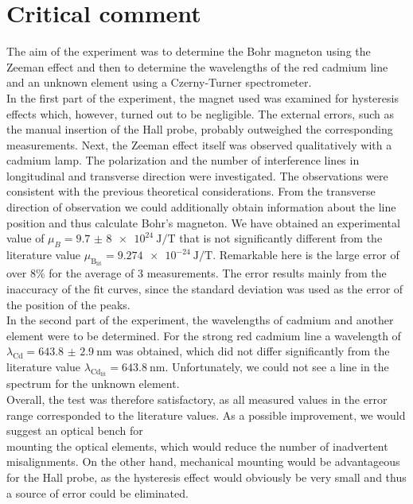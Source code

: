 \section{Critical comment}
The aim of the experiment was to determine the Bohr magneton using the Zeeman effect and then to determine the wavelengths of the red cadmium line and an unknown element using a Czerny-Turner spectrometer.\\
In the first part of the experiment, the magnet used was examined for hysteresis effects which, however, turned out to be negligible.
The external errors, such as the manual insertion of the Hall probe, probably outweighed the corresponding measurements.
Next, the Zeeman effect itself was observed qualitatively with a cadmium lamp.
The polarization and the number of interference lines in longitudinal and transverse direction were investigated.
The observations were consistent with the previous theoretical considerations.
From the transverse direction of observation we could additionally obtain information about the line position and thus calculate Bohr's magneton.
We have obtained an experimental value of $\mu_{B} = \SI{9. 7(8)e24}{\joule\per\tesla}$ that is not significantly different from the literature value $\mu_{\text{B}_\text{lit}} = \SI{9. 274e-24}{\joule\per\tesla}$.
Remarkable here is the large error of over 8\% for the average of 3 measurements.
The error results mainly from the inaccuracy of the fit curves, since the standard deviation was used as the error of the position of the peaks.\\
In the second part of the experiment, the wavelengths of cadmium and another element were to be determined. For the strong red cadmium line a wavelength of $\lambda_\text{Cd}= \SI{643.8(29)}{\nano\meter}$ was obtained, which did not differ significantly from the literature value $\lambda_{\text{Cd}_\text{lit}} = \SI{643.8}{\nano\meter}$.
Unfortunately, we could not see a line in the spectrum for the unknown element.\\
Overall, the test was therefore satisfactory, as all measured values in the error range corresponded to the literature values.
As a possible improvement, we would suggest an optical bench for\\mounting the optical elements, which would reduce the number of inadvertent misalignments.
On the other hand, mechanical mounting would be advantageous for the Hall probe, as the hysteresis effect would obviously be very small and thus a source of error could be eliminated.